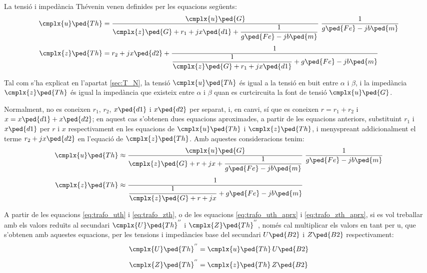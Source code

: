 La tensió i impedància Thévenin venen definides per les equacions
següents:
\begin{align}
    \cmplx{u}\ped{Th} &= \frac{\cmplx{u}\ped{G}}{\cmplx{z}\ped{G} + r_1 + j
    x\ped{d1} + \dfrac{1}{g\ped{Fe}-j b\ped{m}}} \;\frac{1}{g\ped{Fe}-j
    b\ped{m}} \label{eq:trafo_uth}\\[1ex]
    \cmplx{z}\ped{Th} &= r_2 + j x\ped{d2} + \frac{1}{\dfrac{1}{\cmplx{z}\ped{G} + r_1 +
    j x\ped{d1}} + g\ped{Fe}-j b\ped{m}}\label{eq:trafo_zth}
\end{align}

Tal com s'ha explicat en l'apartat \vref{sec:T_N}, la tensió
$\cmplx{u}\ped{Th}$ és igual a la tensió en buit entre $\alpha$ i
$\beta$, i la impedància $\cmplx{z}\ped{Th}$ és igual la impedància
que existeix entre $\alpha$ i $\beta$ quan es curtcircuita la font
de tensió $\cmplx{u}\ped{G}$.

Normalment, no es coneixen $r_1$, $r_2$, $x\ped{d1}$ i $x\ped{d2}$ per separat, i, en canvi, sí que es coneixen $r=r_1+r_2$ i $x=x\ped{d1}+x\ped{d2}$; en aquest
cas s'obtenen dues equacions aproximades, a partir de les equacions
anteriors, substituint $r_1$ i $x\ped{d1}$ per $r$ i $x$ respectivament en
les equacions de $\cmplx{u}\ped{Th}$ i $\cmplx{z}\ped{Th}$, i
menyspreant addicionalment el terme $r_2 + j x\ped{d2}$ en l'equació
de $\cmplx{z}\ped{Th}$. Amb aquestes consideracions tenim:
\begin{align}
    \cmplx{u}\ped{Th} &\approx \frac{\cmplx{u}\ped{G}}{\cmplx{z}\ped{G} + r + j
    x + \dfrac{1}{g\ped{Fe}-j b\ped{m}}} \;\frac{1}{g\ped{Fe}-j
    b\ped{m}} \label{eq:trafo_uth_aprx}\\[1ex]
    \cmplx{z}\ped{Th} &\approx \frac{1}{\dfrac{1}{\cmplx{z}\ped{G} + r +
    j x} + g\ped{Fe}-j b\ped{m}}\label{eq:trafo_zth_aprx}
\end{align}

A partir de les equacions \eqref{eq:trafo_uth} i
\eqref{eq:trafo_zth}, o de les equacions \eqref{eq:trafo_uth_aprx} i
\eqref{eq:trafo_zth_aprx}, si es vol treballar amb els valors
reduïts al secundari $\cmplx{U}\ped{Th}^{''}$ i
$\cmplx{Z}\ped{Th}^{''}$, només cal multiplicar els valors en tant per u, 
que s'obtenen amb aquestes equacions, per les tensions i impedàncies
base del secundari $U\ped{B2}$ i $Z\ped{B2}$ respectivament:
\begin{align}
    \cmplx{U}\ped{Th}^{''} &= \cmplx{u}\ped{Th} \, U\ped{B2} \\[1ex]
    \cmplx{Z}\ped{Th}^{''} &= \cmplx{z}\ped{Th} \, Z\ped{B2}
\end{align}


